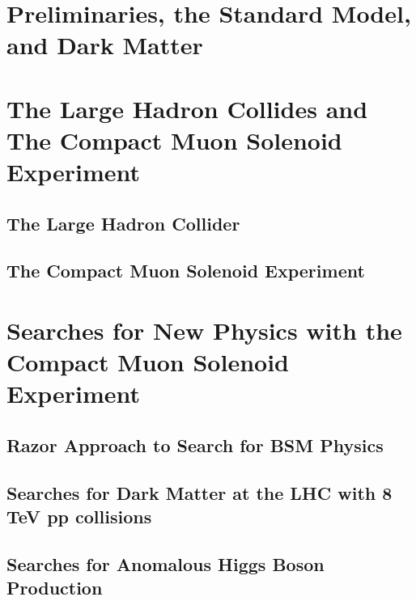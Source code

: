 \documentclass[14pt]{caltech_thesis}
\begin{document}
\begin{publishedcontent}%
\nocite{Cahn:etal:2015}
\end{publishedcontent}

\tableofcontents
\listoffigures
\listoftables
\printnomenclature

\mainmatter
\part{Preliminaries, the Standard Model, and Dark Matter}

\part{The Large Hadron Collides and The Compact Muon Solenoid Experiment}
\chapter{The Large Hadron Collider}

\chapter{The Compact Muon Solenoid Experiment}

\part{ Searches for New Physics with the Compact Muon Solenoid
  Experiment}

\chapter{Razor Approach to Search for BSM Physics}\label{chapter:razor}

\chapter{Searches for Dark Matter at the LHC with 8 TeV pp collisions}\label{DMatLHC}

\chapter{Searches for Anomalous Higgs Boson Production}\label{HggRazor}

\end{document}

